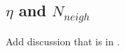 \subsection{$\eta$ and $N_{neigh}$}

Add discussion that is in \cite{priceSmoothedParticleHydrodynamics2012a}.







